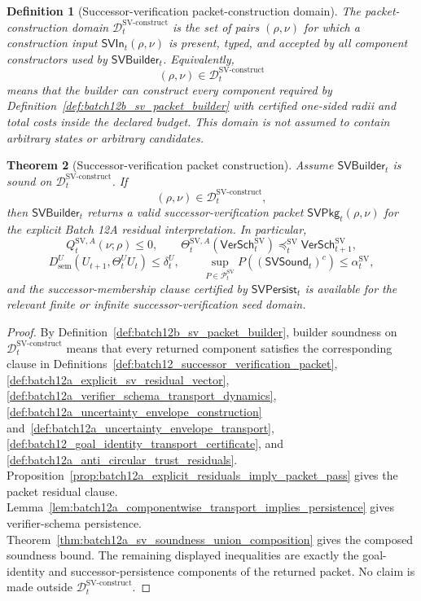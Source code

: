 \documentclass[11pt]{article}
\newtheorem{theorem}{Theorem}[section]
\newtheorem{definition}[theorem]{Definition}
\newcommand{\Pcal}{\mathcal{P}}
\newcommand{\1}{\mathbf{1}}
\providecommand{\Dcal}{\mathcal{D}}
\providecommand{\sem}{\mathrm{sem}}
\begin{document}
\begin{definition}[Successor-verification packet-construction domain]
\label{def:batch12b_sv_packet_construction_domain}
The packet-construction domain \(\Dcal_t^{\mathrm{SV\mbox{-}construct}}\) is the set of pairs \((\rho,\nu)\) for which a construction input \(\mathsf{SVIn}_t(\rho,\nu)\) is present, typed, and accepted by all component constructors used by \(\mathsf{SVBuilder}_t\).  Equivalently,
\[
(\rho,\nu)\in\Dcal_t^{\mathrm{SV\mbox{-}construct}}
\]
means that the builder can construct every component required by Definition~\ref{def:batch12b_sv_packet_builder} with certified one-sided radii and total costs inside the declared budget.  This domain is not assumed to contain arbitrary states or arbitrary candidates.
\end{definition}

\begin{theorem}[Successor-verification packet construction]
\label{thm:batch12b_sv_packet_construction}
Assume \(\mathsf{SVBuilder}_t\) is sound on \(\Dcal_t^{\mathrm{SV\mbox{-}construct}}\).  If
\[
(\rho,\nu)\in\Dcal_t^{\mathrm{SV\mbox{-}construct}},
\]
then \(\mathsf{SVBuilder}_t\) returns a valid successor-verification packet \(\mathsf{SVPkg}_t(\rho,\nu)\) for the explicit Batch 12A residual interpretation.  In particular,
\[
Q_t^{\mathrm{SV},A}(\nu;\rho)\le0,
\qquad
\Theta_t^{\mathrm{SV},A}(\mathsf{VerSch}_t^{\mathrm{SV}})\preceq_t^{\mathrm{SV}}\mathsf{VerSch}_{t+1}^{\mathrm{SV}},
\]
\[
D_{\sem}^U(U_{t+1},\Theta_t^UU_t)\le\delta_t^U,
\qquad
\sup_{P\in\Pcal_t^{\mathrm{SV}}}P((\mathsf{SVSound}_t)^c)\le\alpha_t^{\mathrm{SV}},
\]
and the successor-membership clause certified by \(\mathsf{SVPersist}_t\) is available for the relevant finite or infinite successor-verification seed domain.
\end{theorem}

\begin{proof}
By Definition~\ref{def:batch12b_sv_packet_builder}, builder soundness on \(\Dcal_t^{\mathrm{SV\mbox{-}construct}}\) means that every returned component satisfies the corresponding clause in Definitions~\ref{def:batch12_successor_verification_packet}, \ref{def:batch12a_explicit_sv_residual_vector}, \ref{def:batch12a_verifier_schema_transport_dynamics}, \ref{def:batch12a_uncertainty_envelope_construction} and~\ref{def:batch12a_uncertainty_envelope_transport}, \ref{def:batch12_goal_identity_transport_certificate}, and \ref{def:batch12a_anti_circular_trust_residuals}.  Proposition~\ref{prop:batch12a_explicit_residuals_imply_packet_pass} gives the packet residual clause.  Lemma~\ref{lem:batch12a_componentwise_transport_implies_persistence} gives verifier-schema persistence.  Theorem~\ref{thm:batch12a_sv_soundness_union_composition} gives the composed soundness bound.  The remaining displayed inequalities are exactly the goal-identity and successor-persistence components of the returned packet.  No claim is made outside \(\Dcal_t^{\mathrm{SV\mbox{-}construct}}\).
\end{proof}
\end{document}
